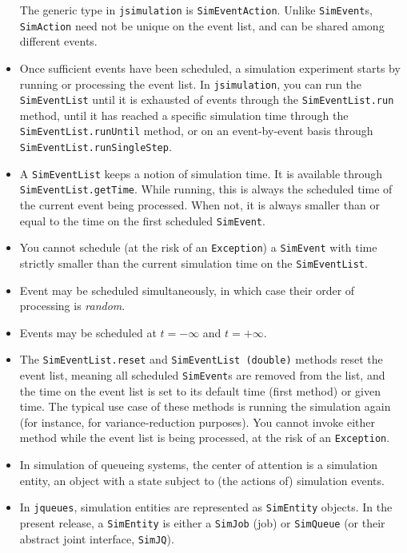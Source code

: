 \begin{itemize}
	The generic type in \lstinline|jsimulation| is \lstinline|SimEventAction|.
	Unlike \lstinline|SimEvent|s, \lstinline|SimAction| need not be unique
	on the event list, and can be shared among different events.
	\item Once sufficient events have been scheduled,
	a simulation experiment starts by running or processing
	the event list.
	In \lstinline|jsimulation|,
	you can run the \lstinline|SimEventList| until it is exhausted
	of events through the \lstinline|SimEventList.run| method,
	until it has reached a specific simulation time
	through the \lstinline|SimEventList.runUntil| method,
	or on an event-by-event basis through \lstinline|SimEventList.runSingleStep|.
	\item A \lstinline|SimEventList| keeps a notion of simulation time.
	It is available through \lstinline|SimEventList.getTime|.
	While running,
	this is always the scheduled time of the current event being processed.
	When not, it is always smaller than or equal to the time
	on the first scheduled \lstinline|SimEvent|.
	\item You cannot schedule (at the risk of an \lstinline|Exception|)
	a \lstinline|SimEvent| with time
	strictly smaller than the current simulation time
	on the \lstinline|SimEventList|.
	\item Event may be scheduled simultaneously,
	in which case their order of processing is {\em random}.
	\item Events may be scheduled at $t=-\infty$ and $t=+\infty$.
	\item The \lstinline|SimEventList.reset| and \lstinline|SimEventList (double)|
	methods reset the event list,
	meaning all scheduled \lstinline|SimEvent|s are removed from the list,
	and the time on the event list is set to its default time (first method)
	or given time.
	The typical use case of these methods is running the simulation again
	(for instance, for variance-reduction purposes).
	You cannot invoke either method while the event list is being processed,
	at the risk of an \lstinline|Exception|.
	\item In simulation of queueing systems,
	the center of attention is a simulation entity,
	an object with a state subject to (the actions of) simulation events.
	\item In \lstinline|jqueues|, simulation entities are represented
	as \lstinline|SimEntity| objects.
	In the present release,
	a \lstinline|SimEntity| is either a \lstinline|SimJob|
	(job) or \lstinline|SimQueue| (or their abstract joint interface,
	\lstinline|SimJQ|).

\end{itemize}
